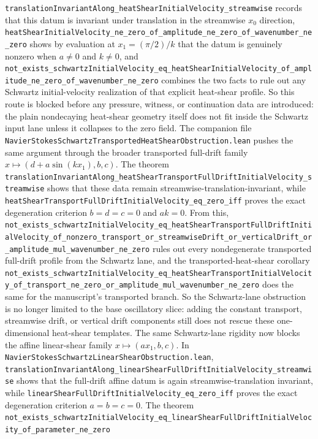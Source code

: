 \documentclass[11pt]{article}
\theoremstyle{remark}
\begin{document}
\texttt{translationInvariantAlong\_heatShearInitialVelocity\_streamwise} records
that this datum is invariant under translation in the streamwise \(x_0\)
direction, \texttt{heatShearInitialVelocity\_ne\_zero\_of\_amplitude\_ne\_zero\_of\_wavenumber\_ne\_zero}
shows by evaluation at \(x_1 = (\pi/2)/k\) that the datum is genuinely nonzero
when \(a \neq 0\) and \(k \neq 0\), and
\texttt{not\_exists\_schwartzInitialVelocity\_eq\_heatShearInitialVelocity\_of\_amplitude\_ne\_zero\_of\_wavenumber\_ne\_zero}
combines the two facts to rule out any Schwartz initial-velocity realization of
that explicit heat-shear profile.  So this route is blocked before any
pressure, witness, or continuation data are introduced: the plain nondecaying
heat-shear geometry itself does not fit inside the Schwartz input lane unless
it collapses to the zero field.
The companion file
\texttt{NavierStokesSchwartzTransportedHeatShearObstruction.lean} pushes the
same argument through the broader transported full-drift family
\(x \mapsto (d + a \sin(k x_1), b, c)\).  The theorem
\texttt{translationInvariantAlong\_heatShearTransportFullDriftInitialVelocity\_streamwise}
shows that these data remain streamwise-translation-invariant, while
\texttt{heatShearTransportFullDriftInitialVelocity\_eq\_zero\_iff} proves the
exact degeneration criterion \(b = d = c = 0\) and \(a k = 0\).  From this,
\texttt{not\_exists\_schwartzInitialVelocity\_eq\_heatShearTransportFullDriftInitialVelocity\_of\_nonzero\_transport\_or\_streamwiseDrift\_or\_verticalDrift\_or\_amplitude\_mul\_wavenumber\_ne\_zero}
rules out every nondegenerate transported full-drift profile from the Schwartz
lane, and the transported-heat-shear corollary
\texttt{not\_exists\_schwartzInitialVelocity\_eq\_heatShearTransportInitialVelocity\_of\_transport\_ne\_zero\_or\_amplitude\_mul\_wavenumber\_ne\_zero}
does the same for the manuscript's transported branch.  So the Schwartz-lane
obstruction is no longer limited to the base oscillatory slice: adding the
constant transport, streamwise drift, or vertical drift components still does
not rescue these one-dimensional heat-shear templates.
The same Schwartz-lane rigidity now blocks the affine linear-shear family
\(x \mapsto (a x_1,b,c)\).  In
\texttt{NavierStokesSchwartzLinearShearObstruction.lean},
\texttt{translationInvariantAlong\_linearShearFullDriftInitialVelocity\_streamwise}
shows that the full-drift affine datum is again streamwise-translation
invariant, while
\texttt{linearShearFullDriftInitialVelocity\_eq\_zero\_iff} proves the exact
degeneration criterion \(a=b=c=0\).  The theorem
\texttt{not\_exists\_schwartzInitialVelocity\_eq\_linearShearFullDriftInitialVelocity\_of\_parameter\_ne\_zero}
\end{document}
